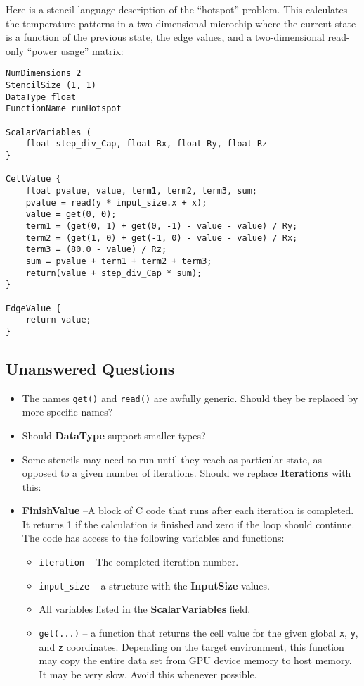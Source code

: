 \documentclass[11pt]{article}
\begin{document}
Here is a stencil language description of the ``hotspot'' problem.  This calculates the temperature patterns in a two-dimensional microchip where the current state is a function of the previous state, the edge values, and a two-dimensional read-only ``power usage'' matrix:
\begin{verbatim}
NumDimensions 2
StencilSize (1, 1)
DataType float
FunctionName runHotspot

ScalarVariables (
    float step_div_Cap, float Rx, float Ry, float Rz
}

CellValue {
    float pvalue, value, term1, term2, term3, sum;
    pvalue = read(y * input_size.x + x);
    value = get(0, 0);
    term1 = (get(0, 1) + get(0, -1) - value - value) / Ry;
    term2 = (get(1, 0) + get(-1, 0) - value - value) / Rx;
    term3 = (80.0 - value) / Rz;
    sum = pvalue + term1 + term2 + term3;
    return(value + step_div_Cap * sum);
}

EdgeValue {
    return value;
}
\end{verbatim}

\subsection{Unanswered Questions}

\begin{itemize}
\item The names {\tt get()} and {\tt read()} are awfully generic.
  Should they be replaced by more specific names?
\item Should {\bf DataType} support smaller types?
\item Some stencils may need to run until they reach as particular
  state, as opposed to a given number of iterations.  Should we
  replace {\bf Iterations} with this:
\item {\bf FinishValue} --A block of C code that runs after each
  iteration is completed.  It returns 1 if the calculation is finished
  and zero if the loop should continue.  The code has access to the
  following variables and functions:
\begin{itemize}
\item {\tt iteration} -- The completed iteration number.
\item {\tt input\_size} -- a structure with the {\bf InputSize} values.
\item All variables listed in the {\bf ScalarVariables} field.
\item {\tt get(...)} -- a function that returns the cell value for the
  given global {\tt x}, {\tt y}, and {\tt z} coordinates.  Depending
  on the target environment, this function may copy the entire data
  set from GPU device memory to host memory.  It may be very slow.
  Avoid this whenever possible.
\end{itemize}
\end{itemize}
\end{document}
